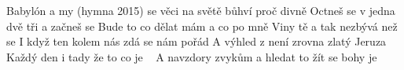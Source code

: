 \begin{TEXT}{Babylón a my (hymna 2015)}
\SLOKA[] se věci na světě bůhví proč divně \NL
Octneš se v  jedna dvě tři a začneš se \NL
Bude to  co dělat mám a co po mně \NL
Viny tě  a tak nezbývá než se \NL
I když ten  kolem nás zdá se nám pořád \NL
A výhled z  není zrovna zlatý Jeruza\NL
Každý den  i tady že  to co je \,\,\,\NL
A navzdory  zvykům a  hledat to \NL
\SLOKA[]   \NL
{}  žít se \NL
{}   bohy \NL
{}  je 
\end{TEXT}
